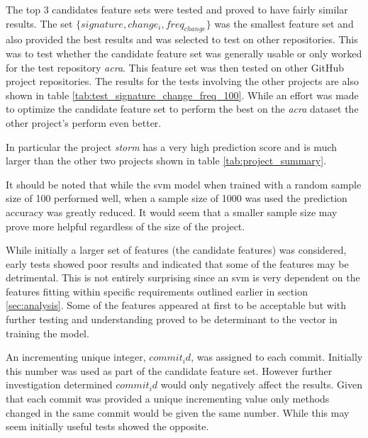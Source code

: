 The top 3 candidates feature sets were tested and proved to have fairly similar results. The set $\{signature, change_i, freq_{change}\}$ was the smallest feature set and also provided the best results and was selected to test on other repositories. This was to test whether the candidate feature set was generally usable or only worked for the test repository \textit{acra}. This feature set was then tested on other GitHub project repositories. The results for the tests involving the other projects are also shown in table \ref{tab:test_signature_change_freq_100}. While an effort was made to optimize the candidate feature set to perform the best on the \textit{acra} dataset the other project's perform even better.

In particular the project \textit{storm} has a very high prediction score and is much larger than the other two projects shown in table \ref{tab:project_summary}.

It should be noted that while the \gls{svm} model when trained with a random sample size of 100 performed well, when a sample size of 1000 was used the prediction accuracy was greatly reduced. It would seem that a smaller sample size may prove more helpful regardless of the size of the project. 





While initially a larger set of features (the candidate features) was considered, early tests showed poor results and indicated that some of the features may be detrimental. This is not entirely surprising since an \gls{svm} is very dependent on the features fitting within specific requirements outlined earlier in section \ref{sec:analysis}. Some of the features appeared at first to be acceptable but with further testing and understanding proved to be determinant to the vector in training the model.

An incrementing unique integer, $commit_id$, was assigned to each commit. Initially this number was used as part of the candidate feature set. However further investigation determined $commit_id$ would only negatively affect the results. Given that each commit was provided a unique incrementing value only methods changed in the same commit would be given the same number. While this may seem initially useful tests showed the opposite. %

